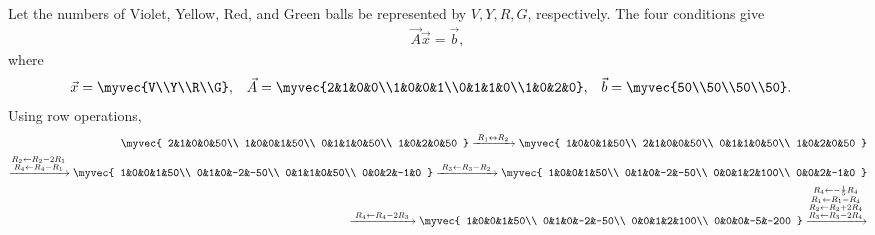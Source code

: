 \begin{enumerate}[label=\thesubsection.\arabic*, ref=\thesubsection.\theenumi,itemsep=0pt]
\begin{enumerate}
\end{enumerate}
%
\solution
Let the numbers of Violet, Yellow, Red, and Green balls be represented by
\(V,Y,R,G\), respectively. The four conditions give
\begin{align}
\vec{A}\vec{x}=\vec{b},
\end{align}
where
\begin{align}
\vec{x}&=\myvec{V\\Y\\R\\G}, &
\vec{A}&=\myvec{2&1&0&0\\1&0&0&1\\0&1&1&0\\1&0&2&0}, &
\vec{b}&=\myvec{50\\50\\50\\50}.
\end{align}
Using row operations,
\begin{align*}
\myvec{
2&1&0&0&50\\
1&0&0&1&50\\
0&1&1&0&50\\
1&0&2&0&50
}
\xrightarrow{\;R_1\leftrightarrow R_2\;}
\myvec{
1&0&0&1&50\\
2&1&0&0&50\\
0&1&1&0&50\\
1&0&2&0&50
}
\\
\xrightarrow{\substack{R_2\leftarrow R_2-2R_1\\R_4\leftarrow R_4-R_1}}
\myvec{
1&0&0&1&50\\
0&1&0&-2&-50\\
0&1&1&0&50\\
0&0&2&-1&0
}
\xrightarrow{\;R_3\leftarrow R_3-R_2\;}
\myvec{
1&0&0&1&50\\
0&1&0&-2&-50\\
0&0&1&2&100\\
0&0&2&-1&0
}
\\
\xrightarrow{\;R_4\leftarrow R_4-2R_3\;}
\myvec{
1&0&0&1&50\\
0&1&0&-2&-50\\
0&0&1&2&100\\
0&0&0&-5&-200
}
\xrightarrow{\substack{R_4\leftarrow-\frac15R_4\\R_1\leftarrow R_1-R_4\\R_2\leftarrow R_2+2R_4\\R_3\leftarrow R_3-2R_4}}

\end{align*}
\end{enumerate}
